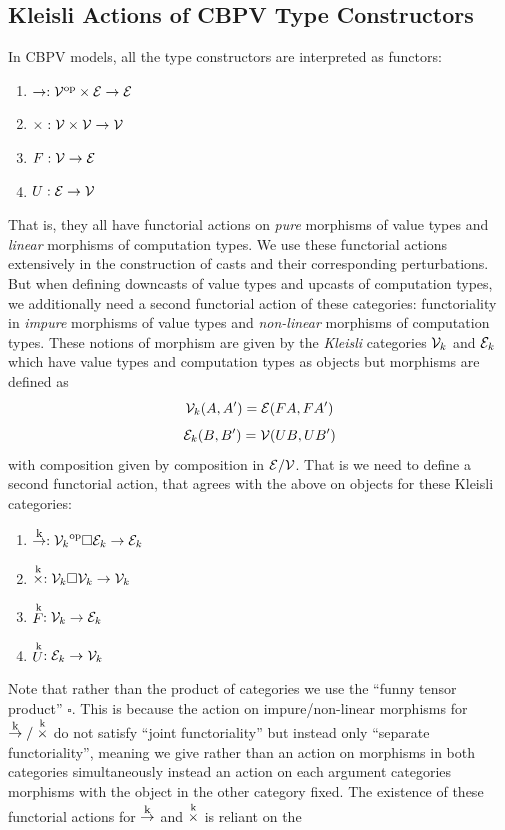 \subsection{Kleisli Actions of CBPV Type Constructors}

In CBPV models, all the type constructors are interpreted as functors:
\begin{enumerate}
\item $\to : {\mathcal{V}}^{\textrm{op}} \times \mathcal{E} \to \mathcal{E}$
\item $\times : \mathcal{V} \times \mathcal{V} \to \mathcal{V}$
\item $F : \mathcal{V} \to \mathcal{E}$
\item $U : \mathcal{E} \to \mathcal{V}$
\end{enumerate}
That is, they all have functorial actions on \emph{pure} morphisms of
value types and \emph{linear} morphisms of computation types.
%
We use these functorial actions extensively in the construction of
casts and their corresponding perturbations. But when defining
downcasts of value types and upcasts of computation types, we
additionally need a second functorial action of these categories:
functoriality in \emph{impure} morphisms of value types and
\emph{non-linear} morphisms of computation types. These notions of
morphism are given by the \emph{Kleisli} categories $\mathcal{V}_k$ and
$\mathcal{E}_k$ which have value types and computation types as objects but
morphisms are defined as
\[ \mathcal{V}_k(A,A') = \mathcal{E}(F A, FA')\]
\[ \mathcal{E}_k(B,B') = \mathcal{V}(U B, U B')\]
with composition given by composition in $\mathcal{E}/\mathcal{V}$.  That is we
need to define a second functorial action, that agrees with the above
on objects for these Kleisli categories:
\begin{enumerate}
\item $\mathrel{\mathop{\to}\limits^{\textrm{\footnotesize k}}} : {\mathcal{V}_k}^{\textrm{op}} \square \mathcal{E}_k \to \mathcal{E}_k$
\item $\mathrel{\mathop{\times}\limits^{\textrm{k}}} : \mathcal{V}_k \square \mathcal{V}_k \to \mathcal{V}_k$
\item $\mathrel{\mathop{F}\limits^{\textrm{k}}} : \mathcal{V}_k \to \mathcal{E}_k$
\item $\mathrel{\mathop{U}\limits^{\textrm{k}}} : \mathcal{E}_k \to \mathcal{V}_k$
\end{enumerate}
Note that rather than the product of categories we use the ``funny
tensor product'' $\square$. This is because the action on
impure/non-linear morphisms for $\mathrel{\mathop{\to}\limits^{\textrm{\footnotesize k}}}/\mathrel{\mathop{\times}\limits^{\textrm{k}}}$ do not satisfy ``joint
functoriality'' but instead only ``separate functoriality'', meaning
we give rather than an action on morphisms in both categories
simultaneously instead an action on each argument categories morphisms
with the object in the other category fixed. The existence of these
functorial actions for $\mathrel{\mathop{\to}\limits^{\textrm{\footnotesize k}}}$ and $\mathrel{\mathop{\times}\limits^{\textrm{k}}}$ is reliant on the
